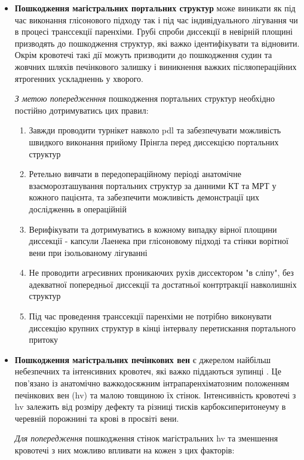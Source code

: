 \begin{refsection}
\begin{itemize}
    \item \textbf{Пошкодження магістральних портальних структур} може виникати як під час виконання глісонового підходу так і під час індивідуального лігування чи в процесі транссекції паренхіми. Грубі спроби диссекції в невірній площині призводять до пошкодження структур, які важко ідентифікувати та відновити. Окрім кровотечі такі дії можуть призводити до пошкодження судин та жовчних шляхів печінкового залишку і виникнення важких післяопераційних ятрогенних ускладненнь у хворого. 
    
    \textit{З метою попередженння} пошкодження портальних структур необхідно постійно дотримуватись цих правил:
    \begin{enumerate}
        \item Завжди проводити турнікет навколо \acrshort{pdl} та забезпечувати можливість швидкого виконання прийому Прінгла перед диссекцією портальних структур 
        \item Ретельно вивчати в передопераційному періоді анатомічне взаєморозташування портальних структур за данними КТ та МРТ у кожного пацієнта, та забезпечити можливість демонстрації цих дослідженнь в операційній
        \item Верифікувати та дотримуватись в кожному випадку вірної площини диссекції - капсули Лаенека при глісоновому підході та стінки ворітної вени при ізольованому лігуванні
        \item Не проводити агресивних проникаючих рухів диссектором "в сліпу", без адекватної попередньої диссекції та достатньої контртракції навколишніх структур
        \item Під час проведення транссекції паренхіми не потрібно виконувати диссекцію крупних структур в кінці інтервалу перетискання портального притоку 
    \end{enumerate}
    
    \item \textbf{Пошкодження магістральних печінкових вен} є джерелом найбільш небезпечних та інтенсивних кровотеч, які важко піддаються зупинці \cite{Li2016}. Це пов'язано із анатомічно важкодосяжним інтрапаренхіматозним положенням печінкових вен (\acrshort{hv}) та малою товщиною їх стінок. Інтенсивність кровотечі з \acrshort{hv} залежить від розміру дефекту та різниці тисків карбоксиперитонеуму в черевній порожнині та крові в просвіті вени. 
    
    \textit{Для попередження} пошкодження стінок магістральних \acrshort{hv} та зменшення кровотечі з них можливо впливати на кожен з цих факторів:
    

\end{itemize}
\end{refsection}
